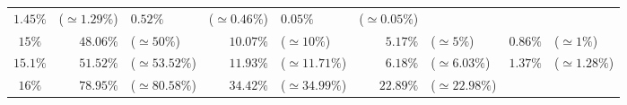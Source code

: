 \documentclass[10pt]{report}
\begin{document}
\begin{exercice}
\begin{center}
\begin{tabular}{|c|rl|rl|rl|rl|}
        $1.45\%$
         & 
    
        ($\simeq1.29\%$)
         & 
    
        $0.52\%$
         & 
    
        ($\simeq0.46\%$)
         & 
    
        $0.05\%$
         & 
    
        ($\simeq0.05\%$)
        
    \\ 

    
        $15\%$
         & 
    
        $48.06\%$
         & 
    
        ($\simeq50\%$)
         & 
    
        $10.07\%$
         & 
    
        ($\simeq10\%$)
         & 
    
        $5.17\%$
         & 
    
        ($\simeq5\%$)
         & 
    
        $0.86\%$
         & 
    
        ($\simeq1\%$)
        
    \\ 

    
        $15.1\%$
         & 
    
        $51.52\%$
         & 
    
        ($\simeq53.52\%$)
         & 
    
        $11.93\%$
         & 
    
        ($\simeq11.71\%$)
         & 
    
        $6.18\%$
         & 
    
        ($\simeq6.03\%$)
         & 
    
        $1.37\%$
         & 
    
        ($\simeq1.28\%$)
        
    \\ 

    
        $16\%$
         & 
    
        $78.95\%$
         & 
    
        ($\simeq80.58\%$)
         & 
    
        $34.42\%$
         & 
    
        ($\simeq34.99\%$)
         & 
    
        $22.89\%$
         & 
    
        ($\simeq22.98\%$)
         & 
    

\end{tabular}
\end{center}
\end{exercice}
\end{document}
